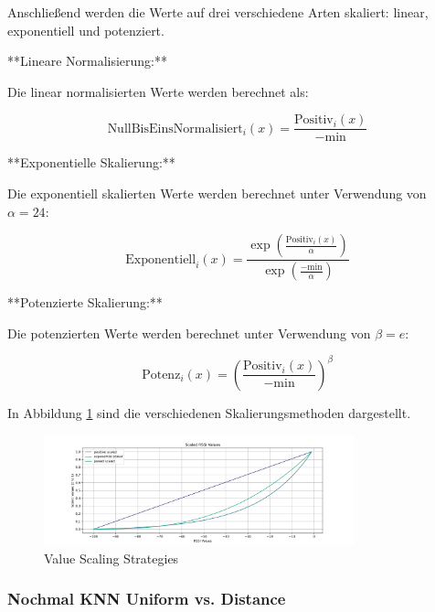 Anschließend werden die Werte auf drei verschiedene Arten skaliert: linear, exponentiell und potenziert.

**Lineare Normalisierung:**

Die linear normalisierten Werte werden berechnet als:

\begin{equation}
    \text{NullBisEinsNormalisiert}_i(x) = \frac{\text{Positiv}_i(x)}{-\text{min}}
    \label{eq:linear_normalized_values}
\end{equation}

**Exponentielle Skalierung:**

Die exponentiell skalierten Werte werden berechnet unter Verwendung von \(\alpha = 24\):

\begin{equation}
    \text{Exponentiell}_i(x) = \frac{\exp\left(\frac{\text{Positiv}_i(x)}{\alpha}\right)}{\exp\left(\frac{-\text{min}}{\alpha}\right)}
    \label{eq:exponential_representation}
\end{equation}

**Potenzierte Skalierung:**

Die potenzierten Werte werden berechnet unter Verwendung von \(\beta = e\):

\begin{equation}
    \text{Potenz}_i(x) = \left(\frac{\text{Positiv}_i(x)}{-\text{min}}\right)^{\beta}
    \label{eq:powered_representation}
\end{equation}

In Abbildung \ref{fig:value_scaling_strategies_ignore_10} sind die verschiedenen Skalierungsmethoden dargestellt.

\begin{figure}[H]
    \centering
    \includegraphics[width=0.8\textwidth]{images/value_scaling_strategies_ignore_10.png}
    \caption{Value Scaling Strategies}
    \label{fig:value_scaling_strategies_ignore_10}
\end{figure}


\subsubsection{Nochmal KNN Uniform vs. Distance}

